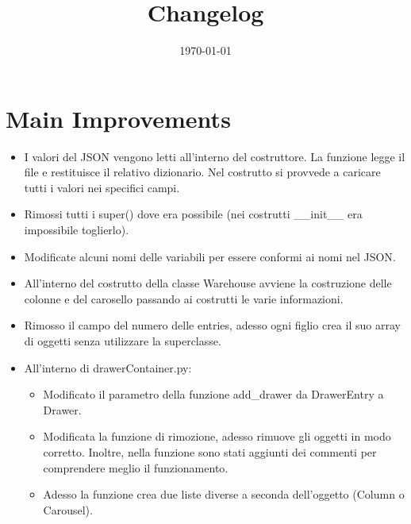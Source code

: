 \documentclass[a4paper]{article}
\begin{document}
	\title{Changelog}
	\date{\today}
	\maketitle
	
	\newpage
	
	\section*{Main Improvements}
	
	\begin{itemize}[label=]
		\item I valori del \textsf{JSON} vengono letti all'interno del costruttore. La funzione legge il file e restituisce il relativo dizionario. Nel costrutto si provvede a caricare tutti i valori nei specifici campi.
		
		\item Rimossi tutti i \textsf{super()} dove era possibile (nei costrutti \textsf{\_\_init\_\_} era impossibile toglierlo).
		
		\item Modificate alcuni nomi delle variabili per essere conformi ai nomi nel \textsf{JSON}.
		
		\item All'interno del costrutto della classe \textsf{Warehouse} avviene la costruzione delle colonne e del carosello passando ai costrutti le varie informazioni.
		
		\item Rimosso il campo del numero delle entries, adesso ogni figlio crea il suo array di oggetti senza utilizzare la superclasse.
		
		\item All'interno di \textsf{drawerContainer.py}:
			\begin{itemize}
				\item Modificato il parametro della funzione add\_drawer da \textsf{DrawerEntry} a \textsf{Drawer}.
				
				\item Modificata la funzione di rimozione, adesso rimuove gli oggetti in modo corretto. Inoltre, nella funzione sono stati aggiunti dei commenti per comprendere meglio il funzionamento.
				
				\item Adesso la funzione crea due liste diverse a seconda dell'oggetto (\textsf{Column} o \textsf{Carousel}).
			\end{itemize}
		

\end{itemize}
\end{document}
